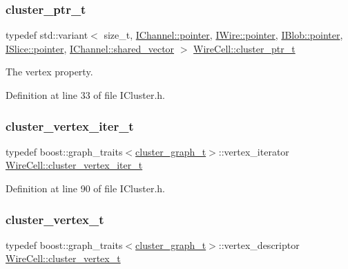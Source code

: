 \subsubsection{\texorpdfstring{cluster\+\_\+ptr\+\_\+t}{cluster\_ptr\_t}}
{\footnotesize\ttfamily typedef std\+::variant$<$ size\+\_\+t, \hyperlink{class_wire_cell_1_1_i_data_aff870b3ae8333cf9265941eef62498bc}{I\+Channel\+::pointer}, \hyperlink{class_wire_cell_1_1_i_data_aff870b3ae8333cf9265941eef62498bc}{I\+Wire\+::pointer}, \hyperlink{class_wire_cell_1_1_i_data_aff870b3ae8333cf9265941eef62498bc}{I\+Blob\+::pointer}, \hyperlink{class_wire_cell_1_1_i_data_aff870b3ae8333cf9265941eef62498bc}{I\+Slice\+::pointer}, \hyperlink{class_wire_cell_1_1_i_data_a6edac35e7dd886018740993b28c7ca1e}{I\+Channel\+::shared\+\_\+vector} $>$ \hyperlink{namespace_wire_cell_a0dd058393dc7c7e35d888c206b9d479d}{Wire\+Cell\+::cluster\+\_\+ptr\+\_\+t}}



The vertex property. 



Definition at line 33 of file I\+Cluster.\+h.

\mbox{\label{namespace_wire_cell_a11c4792993ad2c34d5d4bd1ddf2f1e8a}} 
\subsubsection{\texorpdfstring{cluster\+\_\+vertex\+\_\+iter\+\_\+t}{cluster\_vertex\_iter\_t}}
{\footnotesize\ttfamily typedef boost\+::graph\+\_\+traits$<$\hyperlink{namespace_wire_cell_a6a9ecba14dfba50cdb081820a8bcacbe}{cluster\+\_\+graph\+\_\+t}$>$\+::vertex\+\_\+iterator \hyperlink{namespace_wire_cell_a11c4792993ad2c34d5d4bd1ddf2f1e8a}{Wire\+Cell\+::cluster\+\_\+vertex\+\_\+iter\+\_\+t}}



Definition at line 90 of file I\+Cluster.\+h.

\mbox{\label{namespace_wire_cell_a13568b475bcf41285e67c5d0420bd1c0}} 
\subsubsection{\texorpdfstring{cluster\+\_\+vertex\+\_\+t}{cluster\_vertex\_t}}
{\footnotesize\ttfamily typedef boost\+::graph\+\_\+traits$<$\hyperlink{namespace_wire_cell_a6a9ecba14dfba50cdb081820a8bcacbe}{cluster\+\_\+graph\+\_\+t}$>$\+::vertex\+\_\+descriptor \hyperlink{namespace_wire_cell_a13568b475bcf41285e67c5d0420bd1c0}{Wire\+Cell\+::cluster\+\_\+vertex\+\_\+t}}



